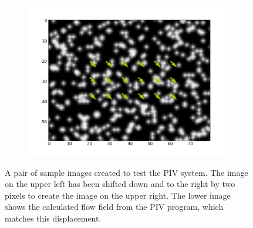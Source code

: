 \documentclass{article}
\begin{document}
\begin{figure}
	\begin{subfigure}[htb]{.7\textwidth}
		\centering
		\includegraphics[width=\textwidth]{fig/x+2_y+2_PIV.png}
	\end{subfigure}
	\caption{A pair of sample images created to test the PIV system. The image on the upper left has been shifted down and to the right by two pixels to create the image on the upper right. The lower image shows the calculated flow field from the PIV program, which matches this displacement.}
	\label{fig:diag_test}
\end{figure}
\end{document}
